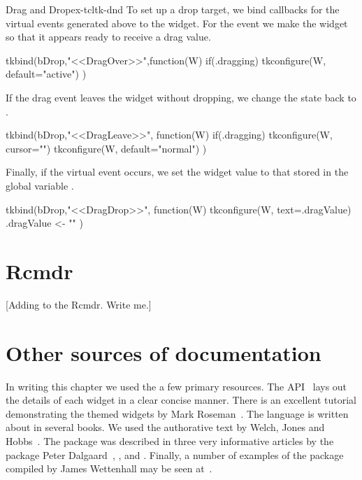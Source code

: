 \begin{example}{Drag and Drop}{ex-tcltk-dnd}
To set up a drop target, we  bind callbacks for the virtual events generated above to the widget. For the  event we make the widget  so that it appears ready to receive a drag value.
\begin{Schunk}
\begin{Sinput}
 tkbind(bDrop,"<<DragOver>>",function(W) {
   if(.dragging) 
     tkconfigure(W, default="active")
 })
\end{Sinput}
\end{Schunk}
If the drag event leaves the widget without dropping, we change the state back to .
\begin{Schunk}
\begin{Sinput}
 tkbind(bDrop,"<<DragLeave>>", function(W) {
   if(.dragging)  {
     tkconfigure(W, cursor="")
     tkconfigure(W, default="normal")  
    }
 })
\end{Sinput}
\end{Schunk}
Finally, if the  virtual event occurs, we set the widget value to that stored in the global variable .
\begin{Schunk}
\begin{Sinput}
 tkbind(bDrop,"<<DragDrop>>", function(W) {
   tkconfigure(W, text=.dragValue)
   .dragValue <- ""
 })
\end{Sinput}
\end{Schunk}
\end{example}


\section{Rcmdr}
\label{sec:tcltk:rcmdr}

[Adding to the Rcmdr. Write me.]


\section{Other sources of documentation}
\label{sec:tcltk:other-sourc-docum}

In writing this chapter we used the a few primary resources. The \TK\/
API~\citep{TclTk:API} lays out the details of each widget in a clear
concise manner. There is an excellent tutorial demonstrating the
themed widgets by Mark Roseman~\citep{TclTk:Tutorial}.  The \TCL\/
language is written about in several books. We used the authorative
text by Welch, Jones and Hobbs~\citep{beedub}. The  package
was described in three very informative articles by the package Peter
Dalgaard~\citep{Dalgaard-DSC}, \citep{Rnews:Dalgaard:2001a}, and
\citep{Rnews:Dalgaard:2002}. Finally, a number of examples of the
package compiled by James Wettenhall may be seen
at~\citep{Wettenhall}.



